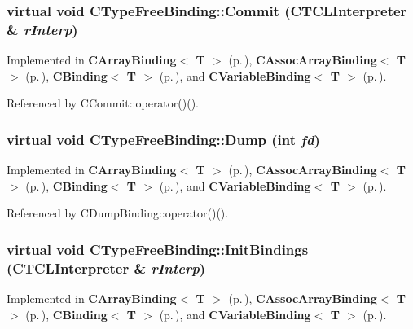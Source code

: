 \subsubsection{\setlength{\rightskip}{0pt plus 5cm}virtual void CType\-Free\-Binding::Commit ({\bf CTCLInterpreter} \& {\em r\-Interp})\hspace{0.3cm}{\tt  [pure virtual]}}\label{classCTypeFreeBinding_a1}




Implemented in {\bf CArray\-Binding$<$ T $>$} {\rm (p.\,\pageref{classCArrayBinding_a11})}, {\bf CAssoc\-Array\-Binding$<$ T $>$} {\rm (p.\,\pageref{classCAssocArrayBinding_a13})}, {\bf CBinding$<$ T $>$} {\rm (p.\,\pageref{classCBinding_a1})}, and {\bf CVariable\-Binding$<$ T $>$} {\rm (p.\,\pageref{classCVariableBinding_a14})}.

Referenced by CCommit::operator()().
\subsubsection{\setlength{\rightskip}{0pt plus 5cm}virtual void CType\-Free\-Binding::Dump (int {\em fd})\hspace{0.3cm}{\tt  [pure virtual]}}\label{classCTypeFreeBinding_a3}




Implemented in {\bf CArray\-Binding$<$ T $>$} {\rm (p.\,\pageref{classCArrayBinding_a13})}, {\bf CAssoc\-Array\-Binding$<$ T $>$} {\rm (p.\,\pageref{classCAssocArrayBinding_a15})}, {\bf CBinding$<$ T $>$} {\rm (p.\,\pageref{classCBinding_a2})}, and {\bf CVariable\-Binding$<$ T $>$} {\rm (p.\,\pageref{classCVariableBinding_a16})}.

Referenced by CDump\-Binding::operator()().
\subsubsection{\setlength{\rightskip}{0pt plus 5cm}virtual void CType\-Free\-Binding::Init\-Bindings ({\bf CTCLInterpreter} \& {\em r\-Interp})\hspace{0.3cm}{\tt  [pure virtual]}}\label{classCTypeFreeBinding_a0}




Implemented in {\bf CArray\-Binding$<$ T $>$} {\rm (p.\,\pageref{classCArrayBinding_a10})}, {\bf CAssoc\-Array\-Binding$<$ T $>$} {\rm (p.\,\pageref{classCAssocArrayBinding_a12})}, {\bf CBinding$<$ T $>$} {\rm (p.\,\pageref{classCBinding_a0})}, and {\bf CVariable\-Binding$<$ T $>$} {\rm (p.\,\pageref{classCVariableBinding_a13})}.

